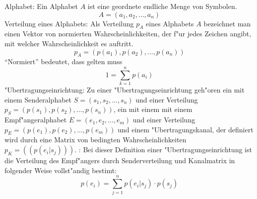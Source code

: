  Alphabet:{
  Ein Alphabet $A$ ist eine geordnete endliche Menge von Symbolen.
  \[
    A=(a_1,a_2,\ldots,a_n)
  \]
}
 Verteilung eines Alphabets:{
  Als Verteilung $p_A$ eines Alphabets $A$ bezeichnet man einen Vektor 
  von normierten Wahrscheinlichkeiten, der f"ur jedes Zeichen 
  angibt, mit welcher Wahrscheinlichkeit es auftritt.
  \[
    p_A=(p(a_1),p(a_2),\ldots,p(a_n))
  \]
  ``Normiert'' bedeutet, dass gelten muss
  \[
    1 = \sum_{k=1}^n p(a_i)
  \]
}
 "Ubertragungseinrichtung:{
  Zu einer "Ubertragungseinrichtung geh"oren ein 
  mit einem Senderalphabet $S=(s_1,s_2,\ldots,s_n)$ 
  und einer Verteilung $p_S=(p(s_1),p(s_2),\ldots,p(s_n))$, 
  ein  mit einem 
  mit einem Empf"angeralphabet $E=(e_1,e_2,\ldots,e_m)$ 
  und einer Verteilung $p_E=(p(e_1),p(e_2),\ldots,p(e_m))$
  und einem "Ubertragungskanal, der definiert wird durch eine Matrix
  von bedingten Wahrscheinlichkeiten $p_K=((p(e_i|s_j)))$.
}
\remark:{
  Bei dieser Definition einer "Ubertragungseinrichtung ist die Verteilung
  des Empf"angers durch Senderverteilung und Kanalmatrix in folgender 
  Weise vollst"andig bestimt:
  \[
    p(e_i)=\sum_{j=1}^n p(e_i|s_j) \cdot p(s_j)
  \]
}
